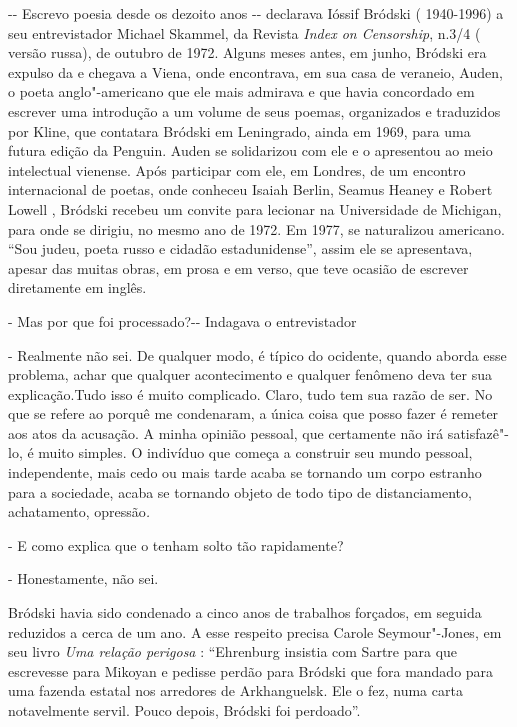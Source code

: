 -\/- Escrevo poesia desde os dezoito anos -\/- declarava Ióssif Bródski
( 1940-1996) a seu entrevistador Michael Skammel, da Revista \emph{Index
on Censorship}, n.3/4 ( versão russa), de outubro de 1972. Alguns meses
antes, em junho, Bródski era expulso da  e chegava a Viena, onde
encontrava, em sua casa de veraneio,  Auden, o poeta
anglo"-americano que ele mais admirava e que havia concordado em escrever
uma introdução a um volume de seus poemas, organizados e traduzidos por
 Kline, que contatara Bródski em Leningrado, ainda em 1969, para uma
futura edição da Penguin. Auden se solidarizou com ele e o apresentou ao
meio intelectual vienense. Após participar com ele, em Londres, de um
encontro internacional de poetas, onde conheceu Isaiah Berlin, Seamus
Heaney e Robert Lowell , Bródski recebeu um convite para lecionar na
Universidade de Michigan, para onde se dirigiu, no mesmo ano de 1972. Em
1977, se naturalizou americano. ``Sou judeu, poeta russo e cidadão
estadunidense'', assim ele se apresentava, apesar das muitas obras, em
prosa e em verso, que teve ocasião de escrever diretamente em inglês.

- Mas por que foi processado?-\/- Indagava o entrevistador

- Realmente não sei. De qualquer modo, é típico do ocidente, quando
aborda esse problema, achar que qualquer acontecimento e qualquer
fenômeno deva ter sua explicação.Tudo isso é muito complicado. Claro,
tudo tem sua razão de ser. No que se refere ao porquê me condenaram, a
única coisa que posso fazer é remeter aos atos da acusação. A minha
opinião pessoal, que certamente não irá satisfazê"-lo, é muito simples. O
indivíduo que começa a construir seu mundo pessoal, independente, mais
cedo ou mais tarde acaba se tornando um corpo estranho para a sociedade,
acaba se tornando objeto de todo tipo de distanciamento, achatamento,
opressão\emph{.}

- E como explica que o tenham solto tão rapidamente?

- Honestamente, não sei.

Bródski havia sido condenado a cinco anos de trabalhos forçados, em
seguida reduzidos a cerca de um ano. A esse respeito precisa Carole
Seymour"-Jones, em seu livro \emph{Uma relação perigosa} : ``Ehrenburg
insistia com Sartre para que escrevesse para Mikoyan e pedisse perdão
para Bródski que fora mandado para uma fazenda estatal nos arredores de
Arkhanguelsk. Ele o fez, numa carta notavelmente servil. Pouco depois,
Bródski foi perdoado''.

